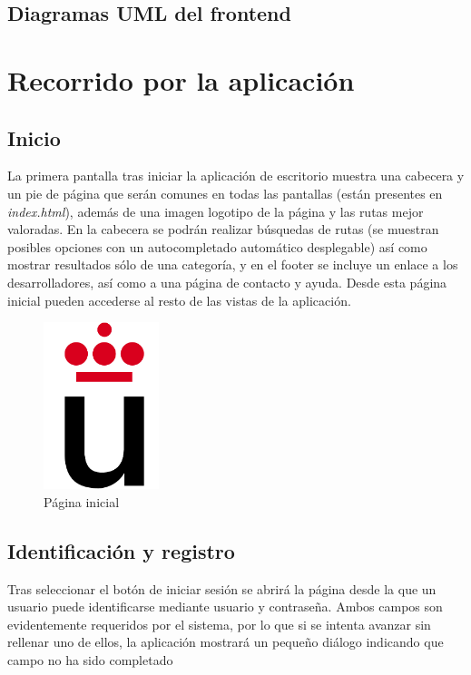 \documentclass[11pt,a4paper]{article}
\begin{document}
\subsection{Diagramas UML del frontend}

\section{Recorrido por la aplicación}
\subsection{Inicio}
La primera pantalla tras iniciar la aplicación de escritorio muestra una cabecera y un pie de página que serán comunes en todas las pantallas (están presentes en \textit{index.html}), además de una imagen logotipo de la página y las rutas mejor valoradas. En la cabecera se podrán realizar búsquedas de rutas (se muestran posibles opciones con un autocompletado automático desplegable) así como mostrar resultados sólo de una categoría, y en el footer se incluye un enlace a los desarrolladores, así como a una página de contacto y ayuda. Desde esta página inicial pueden accederse al resto de las vistas de la aplicación.
\begin{figure}[h]
\centering
  \includegraphics[width=0.3\textwidth]{./imagenes/logoURJC}
  \caption{Página inicial}
  \label{fig: Página inicial}
\end{figure}
\subsection{Identificación y registro}
Tras seleccionar el botón de iniciar sesión se abrirá la página desde la que un usuario puede identificarse mediante usuario y contraseña. Ambos campos son evidentemente requeridos por el sistema, por lo que si se intenta avanzar sin rellenar uno de ellos, la aplicación mostrará un pequeño diálogo indicando que campo no ha sido completado
\end{document}

